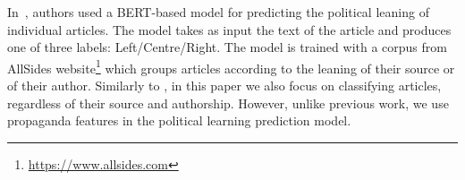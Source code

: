 In~\citet{baly2020we}, authors used a BERT-based model for predicting the political leaning of individual articles. The model takes as input the text of the article and produces one of three labels: Left/Centre/Right. The model is trained with a corpus from AllSides website\footnote{\url{https://www.allsides.com}} which groups articles %
according to the leaning of their source or of their author. %
 Similarly to \citet{baly2020we}, in this paper we also focus on classifying articles, regardless of their source and authorship. However, %
 unlike previous work, we use propaganda features in the political learning prediction model.   





